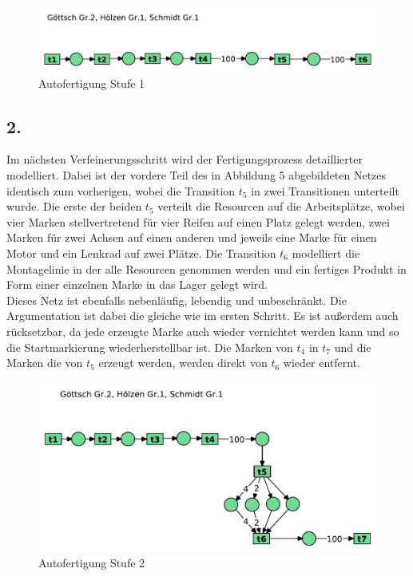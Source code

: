 \documentclass[12pt, paper=a4]{article}
\begin{document}
\begin{figure}[h!]
\centering
\includegraphics[scale=0.7]{7-5-1.pdf}
\caption{Autofertigung Stufe 1}
\end{figure}

\subsection*{2.}
Im nächsten Verfeinerungsschritt wird der Fertigungsprozess detaillierter modelliert. Dabei ist der vordere Teil des in Abbildung 5 abgebildeten Netzes identisch zum vorherigen, wobei die Transition $t_5$ in zwei Transitionen unterteilt wurde. Die erste der beiden $t_5$ verteilt die Resourcen auf die Arbeitsplätze, wobei vier Marken stellvertretend für vier Reifen auf einen Platz gelegt werden, zwei Marken für zwei Achsen auf einen anderen und jeweils eine Marke für einen Motor und ein Lenkrad auf zwei Plätze. Die Transition $t_6$ modelliert die Montagelinie in der alle Resourcen genommen werden und ein fertiges Produkt in Form einer einzelnen Marke in das Lager gelegt wird.\\

Dieses Netz ist ebenfalls nebenläufig, lebendig und unbeschränkt. Die Argumentation ist dabei die gleiche wie im ersten Schritt. Es ist außerdem auch rücksetzbar, da jede erzeugte Marke auch wieder vernichtet werden kann und so die Startmarkierung wiederherstellbar ist. Die Marken von $t_4$ in $t_7$ und die Marken die von $t_5$ erzeugt werden, werden direkt von $t_6$ wieder entfernt.\\

\begin{figure}[h!]
\centering
\includegraphics[scale=0.7]{7-5-2.pdf}
\caption{Autofertigung Stufe 2}
\end{figure}
\end{document}
